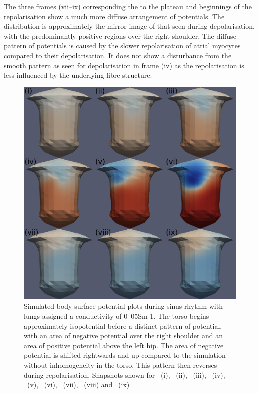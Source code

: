 The three frames (vii--ix) corresponding the to the plateau and beginnings of the
repolarisation show a much more diffuse arrangement of potentials.
The distribution is approximately the mirror image of that seen during
depolarisation, with the predominantly positive regions over the right shoulder.
The diffuse pattern of potentials is caused by the slower repolarisation of
atrial myocytes compared to their depolarisation.
It does not show a disturbance from the smooth pattern as seen for
depolarisation in frame (iv) as the repolarisation is less influenced by the
underlying fibre structure.


\begin{figure}
\includegraphics{figures/bsp/bsp_lungs}
\caption[Body Surface Potential snapshots, with lungs]{
\label{bsp:fig:lungs_bsp}
Simulated body surface potential plots during sinus rhythm with lungs assigned a
conductivity of \unit{0.05}{Sm-1}.
The torso begins approximately isopotential before a distinct pattern of
potential, with an area of negative potential over the right shoulder and an
area of positive potential above the left hip.
The area of negative potential is shifted rightwards and up compared to the
simulation without inhomogeneity in the torso.
This pattern then reverses during repolarisation.
Snapshots shown for \ (i), \ (ii), \ (iii), \ (iv),
\ (v), \ (vi), \ (vii), \ (viii) and \
(ix)
}
\end{figure}

